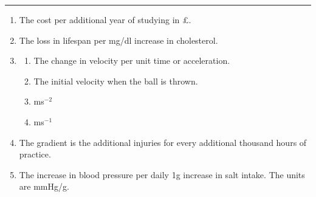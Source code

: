 \documentclass{article}
\begin{document}
\hrule

\medskip

\begin{enumerate}
    \item The cost per additional year of studying in £.
    \item The loss in lifespan per mg/dl increase in cholesterol.
    \item \begin{enumerate}
        \item The change in velocity per unit time or acceleration.
        \item The initial velocity when the ball is thrown.
        \item ms\(^{-2}\)
        \item ms\(^{-1}\)
    \end{enumerate}
    \item The gradient is the additional injuries for every additional thousand hours of practice.
    \item The increase in blood pressure per daily 1g increase in salt intake. The units are mmHg/g.
    
\end{enumerate}
\end{document}
